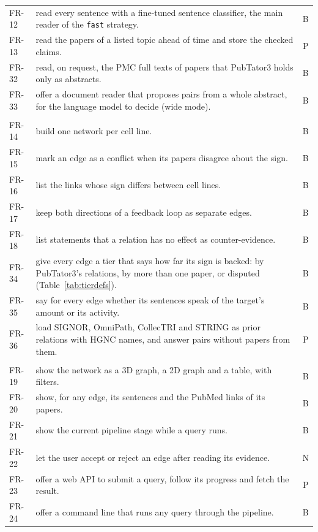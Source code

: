 \documentclass[11pt,a4paper]{article}
\newcommand{\code}[1]{\texttt{#1}}
\begin{document}
{\begin{longtable}{@{}p{1.2cm}p{12.6cm}c@{}}
FR-12 & read every sentence with a fine-tuned sentence classifier, the main reader of the
  \code{fast} strategy. & B\\
FR-13 & read the papers of a listed topic ahead of time and store the checked claims. & P\\
FR-32 & read, on request, the PMC full texts of papers that PubTator3 holds only as abstracts. & B\\
FR-33 & offer a document reader that proposes pairs from a whole abstract, for the language model
  to decide (wide mode). & B\\
\addlinespace
\multicolumn{3}{@{}l}{\textbf{Networks}}\\
FR-14 & build one network per cell line. & B\\
FR-15 & mark an edge as a conflict when its papers disagree about the sign. & B\\
FR-16 & list the links whose sign differs between cell lines. & B\\
FR-17 & keep both directions of a feedback loop as separate edges. & B\\
FR-18 & list statements that a relation has no effect as counter-evidence. & B\\
FR-34 & give every edge a tier that says how far its sign is backed: by PubTator3's relations, by
  more than one paper, or disputed (Table~\ref{tab:tierdefs}). & B\\
FR-35 & say for every edge whether its sentences speak of the target's amount or its activity. & B\\
FR-36 & load SIGNOR, OmniPath, CollecTRI and STRING as prior relations with HGNC names, and answer
  pairs without papers from them. & P\\
\addlinespace
\multicolumn{3}{@{}l}{\textbf{User interface and API}}\\
FR-19 & show the network as a 3D graph, a 2D graph and a table, with filters. & B\\
FR-20 & show, for any edge, its sentences and the PubMed links of its papers. & B\\
FR-21 & show the current pipeline stage while a query runs. & B\\
FR-22 & let the user accept or reject an edge after reading its evidence. & N\\
FR-23 & offer a web API to submit a query, follow its progress and fetch the result. & P\\
FR-24 & offer a command line that runs any query through the pipeline. & B\\

\end{longtable}}
\end{document}
